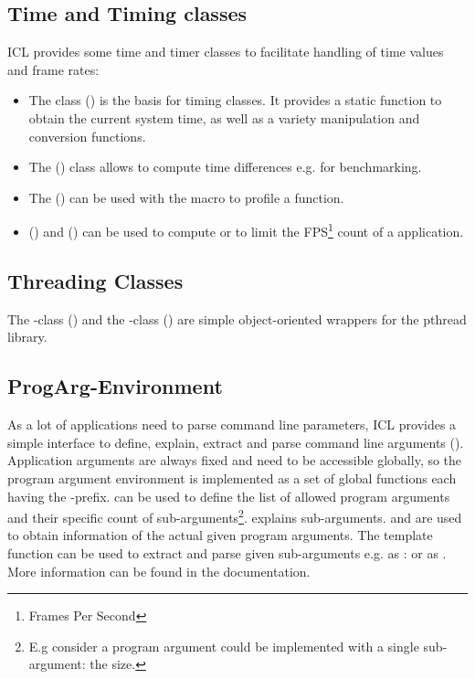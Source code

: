 \subsection{Time and Timing classes}
ICL provides some time and timer classes to facilitate handling of time values and frame rates:
\begin{itemize}
\item The  class () is the basis for timing classes. It provides a static function  to obtain the current system time, as well as a variety manipulation and conversion functions.
\item The  () class allows to compute time differences e.g. for benchmarking.
\item The  () can be used with the macro  to profile a function.
\item {} () and  () can be used to compute or to limit the FPS\footnote{Frames Per Second} count of a application.
\end{itemize}

\subsection{Threading Classes}
The -class () and the -class () are simple object-oriented wrappers for the pthread library.

\subsection{ProgArg-Environment} 
As a lot of applications need to parse command line parameters, ICL provides a simple interface to define, explain, extract and parse command line arguments (). Application arguments are always fixed and need to be accessible globally, so the program argument environment is  implemented as a set of global functions each having the -prefix.  can be used to define the list of allowed program arguments and their specific count of sub-arguments\footnote{E.g consider a program argument  could be implemented with a single sub-argument: the size.}.  explains sub-arguments.  and  are used to obtain information of the actual given program arguments.  The  template function can be used to extract and parse given sub-arguments e.g. as :
or as 
. More information can be found in the documentation.

